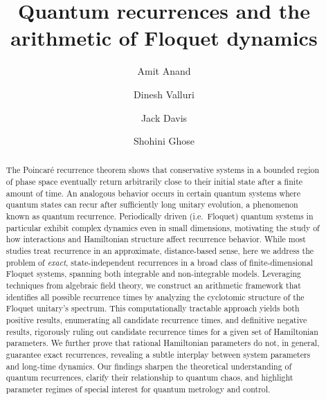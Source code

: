 \documentclass[a4paper,onecolumn,accepted=2026-04-08,10pt]{quantumarticle}
\date{}
\theoremstyle{definition}
\begin{document}
\title{Quantum recurrences and the arithmetic of Floquet dynamics}

\author[1,2]{Amit Anand}
\author[1]{Dinesh Valluri} 
\author[5]{Jack Davis}
\author[1,2,3,4]{Shohini Ghose}

\maketitle

\begin{abstract}
The Poincaré recurrence theorem shows that conservative systems in a bounded region of phase space eventually return arbitrarily close to their initial state after a finite amount of time. 
An analogous behavior occurs in certain quantum systems where quantum states can recur after sufficiently long unitary evolution, a phenomenon known as quantum recurrence. Periodically driven (i.e.\ Floquet) quantum systems in particular exhibit complex dynamics even in small dimensions, motivating the study of how interactions and Hamiltonian structure affect recurrence behavior. While most studies treat recurrence in an approximate, distance-based sense, here we address the problem of \textit{exact}, state-independent recurrences in a broad class of finite-dimensional Floquet systems, spanning both integrable and non-integrable models. 
Leveraging techniques from algebraic field theory, we construct an arithmetic framework that identifies all possible recurrence times by analyzing the cyclotomic structure of the Floquet unitary's spectrum. 
This computationally tractable approach yields both positive results, enumerating all candidate recurrence times, and definitive negative results, rigorously ruling out candidate recurrence times for a given set of Hamiltonian parameters. 
We further prove that rational Hamiltonian parameters do not, in general, guarantee exact recurrences, revealing a subtle interplay between system parameters and long-time dynamics. 
Our findings sharpen the theoretical understanding of quantum recurrences, clarify their relationship to quantum chaos, and highlight parameter regimes of special interest for quantum metrology and control.


\end{abstract}
\end{document}
